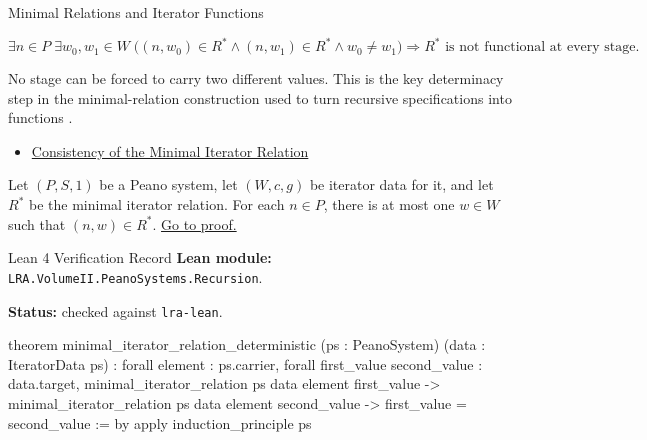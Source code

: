 \begin{topicbox}{Minimal Relations and Iterator Functions}
\begin{remark*}
\[
\exists n\in P\;\exists w_0,w_1\in W\;
\bigl((n,w_0)\in R^*\land (n,w_1)\in R^*\land w_0\neq w_1\bigr)
\Longrightarrow
R^* \text{ is not functional at every stage}.
\]
\end{remark*}

\begin{remark*}[Interpretation]
No stage can be forced to carry two different values. This is the key
determinacy step in the minimal-relation construction used to turn recursive
specifications into functions \citep{FefermanNumberSystems1964}.
\end{remark*}

\begin{dependencies}
\begin{itemize}
  \item \hyperref[lem:iterator-relation-consistency]{Consistency of the Minimal Iterator Relation}
\end{itemize}
\end{dependencies}

\begin{tcolorbox}[colback=lembox, colframe=lemborder, arc=2pt,
  left=6pt, right=6pt, top=4pt, bottom=4pt,
  title={\small\textbf{Lemma (Determinism of the Minimal Iterator Relation)}},
  fonttitle=\small\bfseries]
\begin{lemma}
\label{lem:minimal-iterator-relation-deterministic}
Let $(P,S,1)$ be a Peano system, let $(W,c,g)$ be iterator data for it, and let
$R^*$ be the minimal iterator relation. For each $n\in P$, there is at most one
$w\in W$ such that $(n,w)\in R^*$.
\hyperref[prf:minimal-iterator-relation-deterministic]{Go to proof.}
\end{lemma}
\end{tcolorbox}

\begin{formalizationrecord}{Lean 4 Verification Record}
\textbf{Lean module:} \texttt{LRA.VolumeII.PeanoSystems.Recursion}.\par
{}
\textbf{Status:} checked against \texttt{lra-lean}.\par

\begin{leancode}
theorem minimal_iterator_relation_deterministic
    (ps : PeanoSystem)
    (data : IteratorData ps) :
    forall element : ps.carrier,
      forall first_value second_value : data.target,
        minimal_iterator_relation ps data element first_value ->
        minimal_iterator_relation ps data element second_value ->
        first_value = second_value := by
  apply induction_principle ps


\end{leancode}
\end{formalizationrecord}
\end{topicbox}
